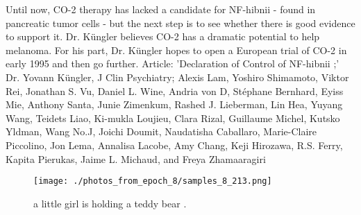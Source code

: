\documentclass{article}%
\begin{document}
Until now, CO{-}2 therapy has lacked a candidate for NF{-}hibnii {-} found in pancreatic tumor cells {-} but the next step is to see whether there is good evidence to support it. Dr. Küngler believes CO{-}2 has a dramatic potential to help melanoma. For his part, Dr. Küngler hopes to open a European trial of CO{-}2 in early 1995 and then go further.\newline%
Article: 'Declaration of Control of NF{-}hibnii ;' Dr. Yovann Küngler, J Clin Psychiatry; Alexis Lam, Yoshiro Shimamoto, Viktor Rei, Jonathan S. Vu, Daniel L. Wine, Andria von D, Stéphane Bernhard, Eyiss Mie, Anthony Santa, Junie Zimenkum, Rashed J. Lieberman, Lin Hea, Yuyang Wang, Teidets Liao, Ki{-}mukla Loujieu, Clara Rizal, Guillaume Michel, Kutsko Yldman, Wang No.J, Joichi Doumit, Naudatisha Caballaro, Marie{-}Claire Piccolino, Jon Lema, Annalisa Lacobe, Amy Chang, Keji Hirozawa, R.S. Ferry, Kapita Pierukas, Jaime L. Michaud, and Freya Zhamaaragiri\newline%

%


\begin{figure}[h!]%
\centering%
\texttt{[image: ./photos\_from\_epoch\_8/samples\_8\_213.png]}%
\caption{a little girl is holding a teddy bear .}%
\end{figure}

%
\end{document}

